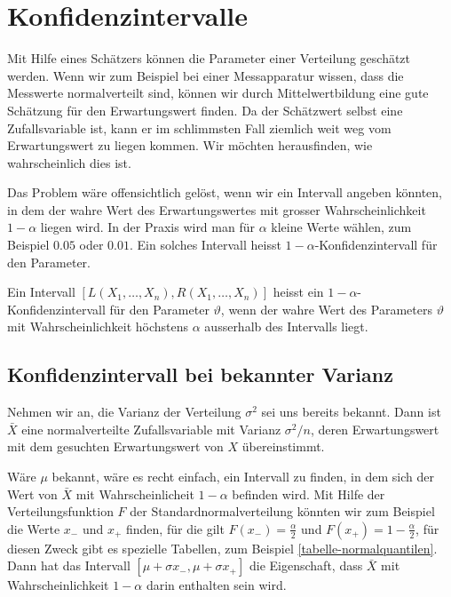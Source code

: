 \section{Konfidenzintervalle}
\label{section-konfidenzintervalle}
Mit Hilfe eines Schätzers können die Parameter einer Verteilung
geschätzt werden.
Wenn wir zum Beispiel bei einer Messapparatur
wissen, dass die Messwerte normalverteilt sind, können wir durch
Mittelwertbildung eine gute Schätzung für den Erwartungswert finden.
Da der Schätzwert selbst eine Zufallsvariable ist, kann er
im schlimmsten Fall ziemlich weit weg vom Erwartungswert zu liegen
kommen.
Wir möchten herausfinden, wie wahrscheinlich dies ist.

Das Problem wäre offensichtlich gelöst, wenn wir ein Intervall
angeben könnten, in dem der wahre Wert des Erwartungswertes mit
grosser Wahrscheinlichkeit $1-\alpha$ liegen wird.
In der Praxis
wird man für $\alpha$ kleine Werte wählen, zum Beispiel $0.05$ oder $0.01$.
Ein solches Intervall heisst $1-\alpha$-Konfidenzintervall für den
Parameter.

\begin{definition}
Ein Intervall $[L(X_1,\dots,X_n),R(X_1,\dots,X_n)]$
heisst ein $1-\alpha$-Konfidenzintervall
für den Parameter $\vartheta$, wenn der wahre Wert des Parameters
$\vartheta$ mit Wahrscheinlichkeit höchstens $\alpha$ ausserhalb
des Intervalls liegt.
\end{definition}

\subsection{Konfidenzintervall bei bekannter Varianz}
Nehmen wir an, die Varianz der Verteilung $\sigma^2$ sei uns bereits bekannt.
Dann ist $\bar X$ eine normalverteilte Zufallsvariable mit Varianz
$\sigma^2/n$, deren Erwartungswert mit dem gesuchten Erwartungswert von $X$
übereinstimmt. 

Wäre $\mu$ bekannt, wäre es recht einfach, ein Intervall zu finden,
in dem sich der Wert von $\bar X$ mit Wahrscheinlicheit $1-\alpha$ befinden
wird.
Mit Hilfe der Verteilungsfunktion $F$ der Standardnormalverteilung
könnten wir zum Beispiel die Werte $x_-$ und $x_+$ finden, für die
gilt $F(x_-)=\frac{\alpha}{2}$ und $F(x_+)=1-\frac{\alpha}{2}$, für
diesen Zweck gibt es spezielle Tabellen, zum Beispiel
\ref{tabelle-normalquantilen}.
Dann hat das Intervall
$[\mu+\sigma x_-,\mu+\sigma x_+]$ die Eigenschaft, dass $\bar X$
mit Wahrscheinlichkeit $1-\alpha$ darin enthalten sein wird.

